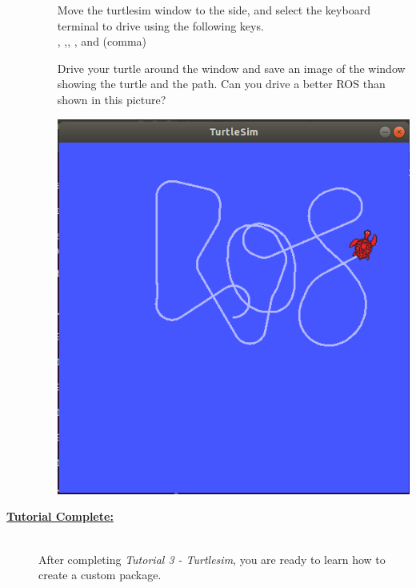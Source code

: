 \documentclass[12pt]{article}
\begin{document}
\begin{description}
\begin{enumerate}
\begin{multicols}{2}

\begin{framed}
Move the turtlesim window to the side, and select the keyboard terminal to drive using the following keys.\vspace{2mm}\\ \IKey, \JKey,\KayKey, \ELKey, and \COMMAKey (comma) \vspace{5mm}

Drive your turtle around the window and save an image of the window showing the turtle and the path. Can you drive a better ROS than shown in this picture? 
\end{framed}

\includegraphics[scale=0.35]{tutorial3_fig1.png}	
\end{multicols}			
			
\end{enumerate}  

\item[\textbf{\underline{Tutorial Complete:}}] \hfill \vspace{3mm}\\
After completing {\it Tutorial 3 - Turtlesim}, you are ready to learn how to create a custom package.



\end{description}
\end{document}
